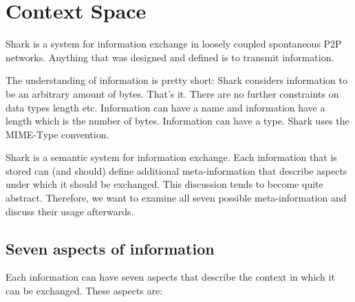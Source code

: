 \chapter{Context Space}
Shark is a system for information exchange in loosely coupled spontaneous P2P networks. Anything that was designed and defined is to transmit information.

The understanding of information is pretty short:
Shark considers information to be an arbitrary amount of bytes. That's it. There are no further constraints on data types length etc. Information can have a name and information have a length which is the number of bytes. Information can have a type. Shark uses the MIME-Type convention.

Shark is a semantic system for information exchange. Each information that is stored can (and should) define additional meta-information that describe aspects
under which it should be exchanged. This discussion tends to become quite abstract. Therefore, we want to examine all seven possible meta-information and discuss their usage afterwards.

\section{Seven aspects of information}

Each information can have seven aspects that describe the context in which it can be exchanged. These aspects are:

